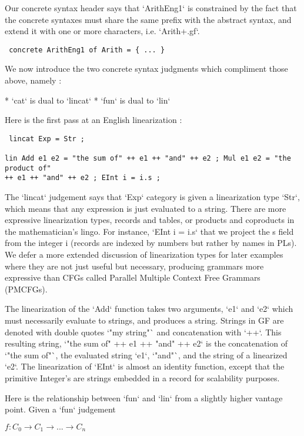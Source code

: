 Our concrete syntax header says that `ArithEng1` is constrained by the fact that
the concrete syntaxes must share the same prefix with the abstract syntax, and
extend it with one or more characters, i.e. `Arith+.gf`.

\begin{verbatim} concrete ArithEng1 of Arith = { ... }
\end{verbatim}

We now introduce the two concrete syntax judgments which compliment those above,
namely :

* `cat` is dual to `lincat` * `fun` is dual to `lin`

Here is the first pass at an English linearization :

\begin{verbatim} lincat Exp = Str ;

lin Add e1 e2 = "the sum of" ++ e1 ++ "and" ++ e2 ; Mul e1 e2 = "the product of"
++ e1 ++ "and" ++ e2 ; EInt i = i.s ;
\end{verbatim}

The `lincat` judgement says that `Exp` category is given a linearization type
`Str`, which means that any expression is just evaluated to a string. There are
more expressive linearization types, records and tables, or products and
coproducts in the mathematician's lingo. For instance, `EInt i = i.s` that we
project the s field from the integer i (records are indexed by numbers but
rather by names in PLs). We defer a more extended discussion of linearization
types for later examples where they are not just useful but necessary, producing
grammars more expressive than CFGs called Parallel Multiple Context Free
Grammars (PMCFGs).

The linearization of the `Add` function takes two arguments, `e1` and `e2` which
must necessarily evaluate to strings, and produces a string. Strings in GF are
denoted with double quotes `"my string"` and concatenation with `++`. This
resulting string, `"the sum of" ++ e1 ++ "and" ++ e2` is the concatenation of
`"the sum of"`, the evaluated string `e1`, `"and"`, and the string of a
linearized `e2`. The linearization of `EInt` is almost an identity function,
except that the primitive Integer's are strings embedded in a record for
scalability purposes.

Here is the relationship between `fun` and `lin` from a slightly higher vantage
point. Given a `fun` judgement

  $f {:} C_0 \rightarrow C_1 \rightarrow ... \rightarrow C_n$

